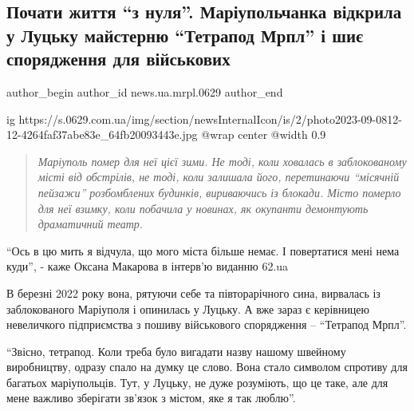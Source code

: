  
 
 
 
 
 
\subsection{Почати життя \enquote{з нуля}. Маріупольчанка відкрила у Луцьку майстерню \enquote{Тетрапод Мрпл} і шиє спорядження для військових}
\label{sec:08_09_2023.stz.news.ua.mrpl.0629.1.pochaty_zhyttja_z_nulja}
 
\ifcmt
 author_begin
   author_id news.ua.mrpl.0629
 author_end
\fi

\ifcmt
  ig https://s.0629.com.ua/img/section/newsInternalIcon/is/2/photo2023-09-0812-12-4264faf37abe83e_64fb20093443e.jpg
  @wrap center
  @width 0.9
\fi

\begin{quote}
\em
Маріуполь помер для неї цієї зими. Не тоді, коли ховалась в заблокованому місті
від обстрілів, не тоді, коли залишала його, перетинаючи \enquote{місячній пейзажи}
розбомблених будинків, вириваючись із блокади. Місто померло для неї взимку,
коли побачила у новинах, як окупанти демонтують драматичний театр.
\end{quote}

\enquote{Ось в цю мить я відчула, що мого міста більше немає. І повертатися мені нема
куди}, - каже Оксана Макарова в інтерв'ю виданню 62.ua

В березні 2022 року вона, рятуючи себе та півторарічного сина, вирвалась із
заблокованого Маріуполя і опинилась у Луцьку. А вже зараз є керівницею
невеличкого підприємства з пошиву військового спорядження – \enquote{Тетрапод
Мрпл}.

\enquote{Звісно, тетрапод. Коли треба було вигадати назву нашому швейному виробництву,
одразу спало на думку це слово. Вона стало символом спротиву для багатьох
маріупольців. Тут, у Луцьку, не дуже розуміють, що це таке, але для мене
важливо зберігати зв'язок з містом, яке я так люблю}.

